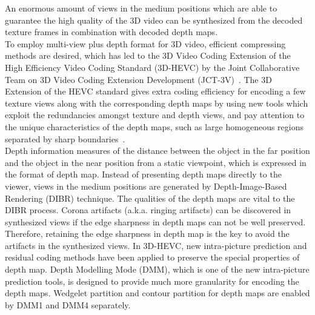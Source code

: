 An enormous amount of views in the medium positions which are able to
guarantee the high quality of the 3D video can be synthesized from
the decoded texture frames in combination with decoded depth maps.\\
\newline
To employ multi-view plus depth format for 3D video, efficient compressing
methods are desired, which has led to the 3D Video Coding Extension of the
High Efficiency Video Coding Standard (3D-HEVC) by the Joint Collaborative Team
on 3D Video Coding Extension Development (JCT-3V)~\parencite{RN195}.
The 3D Extension of the HEVC standard gives extra coding efficiency
for encoding a few texture views along with the corresponding depth maps by
using new tools which exploit the redundancies amongst
texture and depth views, and pay attention to the unique characteristics of
the depth maps, such as large homogeneous
regions separated by sharp boundaries~\parencite{RN47}.\\
\newline
Depth information measures of the distance between the object in the far position
and the object in the near position from a static viewpoint,
which is expressed in the format of depth map.
Instead of presenting depth maps directly to the viewer, views in the medium
positions are generated by Depth-Image-Based Rendering (DIBR) technique.
The qualities of the depth maps are vital to the DIBR process.
Corona artifacts (a.k.a. ringing artifacts) can be discovered in synthesized
views if the edge sharpness in depth maps can not be well
preserved.
Therefore, retaining the edge sharpness in depth map is the key to avoid the
artifacts in the synthesized views.
In 3D-HEVC, new intra-picture prediction and residual coding methods
have been applied to preserve the special properties of depth
map.
Depth Modelling Mode (DMM), which is one of the new intra-picture
prediction tools, is designed to provide much more granularity for
encoding the depth maps.
Wedgelet partition and contour partition for depth maps
are enabled by DMM1 and DMM4 separately.



